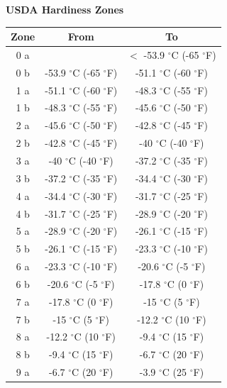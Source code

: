 \documentclass[10pt]{extarticle}
\begin{document}
\begin{center}
\textbf{USDA Hardiness Zones}\\
\begin{tabular}{|c|c|c|}
\hline 
Zone & 	From &	To
\\
\hline 
0 a & & $<$ -53.9 $^{\circ}$C (-65 $^{\circ}$F) 
\\
\hline 
0 b & -53.9 $^{\circ}$C (-65 $^{\circ}$F) &	-51.1 $^{\circ}$C (-60 $^{\circ}$F)
\\
\hline 
1  a &	-51.1 $^{\circ}$C (-60 $^{\circ}$F) &	-48.3 $^{\circ}$C (-55 $^{\circ}$F)
 \\
\hline 
1  b &-48.3 $^{\circ}$C (-55 $^{\circ}$F) &	-45.6 $^{\circ}$C (-50 $^{\circ}$F)
\\
\hline 
2 a &	-45.6 $^{\circ}$C (-50 $^{\circ}$F)& 	-42.8 $^{\circ}$C (-45 $^{\circ}$F)
\\
\hline 
2 b & 	-42.8 $^{\circ}$C (-45 $^{\circ}$F) &	-40 $^{\circ}$C (-40 $^{\circ}$F)
\\
\hline 
3 a &	-40 $^{\circ}$C (-40 $^{\circ}$F) &	-37.2 $^{\circ}$C (-35 $^{\circ}$F)
\\
\hline 
3 b &	-37.2 $^{\circ}$C (-35 $^{\circ}$F) &	-34.4 $^{\circ}$C (-30 $^{\circ}$F)
\\
\hline 
4 a &	-34.4 $^{\circ}$C (-30 $^{\circ}$F) &	-31.7 $^{\circ}$C (-25 $^{\circ}$F)
\\
\hline 
4 b &	-31.7 $^{\circ}$C (-25 $^{\circ}$F) &	-28.9 $^{\circ}$C (-20 $^{\circ}$F)
\\
\hline 
5 a &	-28.9 $^{\circ}$C (-20 $^{\circ}$F) &	-26.1 $^{\circ}$C (-15 $^{\circ}$F)
\\
\hline 
5 b &	-26.1 $^{\circ}$C (-15 $^{\circ}$F) &	-23.3 $^{\circ}$C (-10 $^{\circ}$F)
\\
\hline 
6 a &	-23.3 $^{\circ}$C (-10 $^{\circ}$F) &	-20.6 $^{\circ}$C (-5 $^{\circ}$F)
\\
\hline 
6 b &	-20.6 $^{\circ}$C (-5 $^{\circ}$F) &	-17.8 $^{\circ}$C (0 $^{\circ}$F)
\\
\hline 
7 a &	-17.8 $^{\circ}$C (0 $^{\circ}$F) &	-15 $^{\circ}$C (5 $^{\circ}$F)
\\
\hline 
7 b &	-15 $^{\circ}$C (5 $^{\circ}$F) &	-12.2 $^{\circ}$C (10 $^{\circ}$F)
\\
\hline 
8 a &	-12.2 $^{\circ}$C (10 $^{\circ}$F) &	-9.4 $^{\circ}$C (15 $^{\circ}$F)
\\
\hline 
8 b &	-9.4 $^{\circ}$C (15 $^{\circ}$F) &	-6.7 $^{\circ}$C (20 $^{\circ}$F)
\\
\hline 
9 a &	-6.7 $^{\circ}$C (20 $^{\circ}$F) &	-3.9 $^{\circ}$C (25 $^{\circ}$F) \\

\end{tabular}
\end{center}
\end{document}
